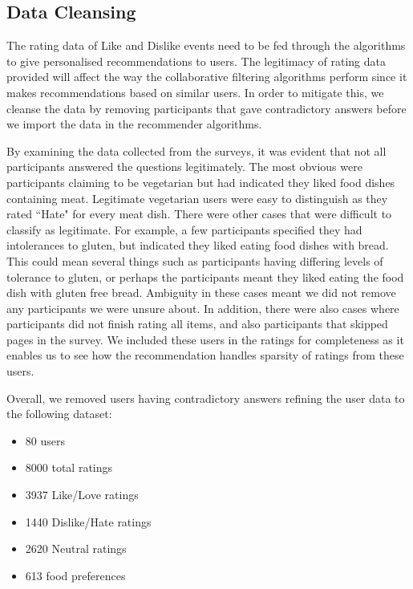 
\subsection{Data Cleansing}

The rating data of Like and Dislike events need to be fed through the algorithms to give personalised recommendations to users. The legitimacy of rating data provided will affect the way the collaborative filtering algorithms perform since it makes recommendations based on similar users. In order to mitigate this, we cleanse the data by removing participants that gave contradictory answers before we import the data in the recommender algorithms.


By examining the data collected from the surveys, it was evident that not all participants answered the questions legitimately. The most obvious were participants claiming to be vegetarian but had indicated they liked food dishes containing meat. Legitimate vegetarian users were easy to distinguish as they rated ``Hate" for every meat dish. There were other cases that were difficult to classify as legitimate. For example, a few participants specified they had intolerances to gluten, but indicated they liked eating food dishes with bread. This could mean several things such as participants having differing levels of tolerance to gluten, or perhaps the participants meant they liked eating the food dish with gluten free bread. Ambiguity in these cases meant we did not remove any participants we were unsure about. In addition, there were also cases where participants did not finish rating all items, and also participants that skipped pages in the survey. We included these users in the ratings for completeness as it enables us to see how the recommendation handles sparsity of ratings from these users. 

Overall, we removed users having contradictory answers refining the user data to the following dataset:
\begin{itemize}
	\item{80 users}
	\item{8000 total ratings}
	\item{3937 Like/Love ratings}
	\item{1440 Dislike/Hate ratings}
    \item{2620 Neutral ratings}
	\item{613 food preferences}
\end{itemize}

